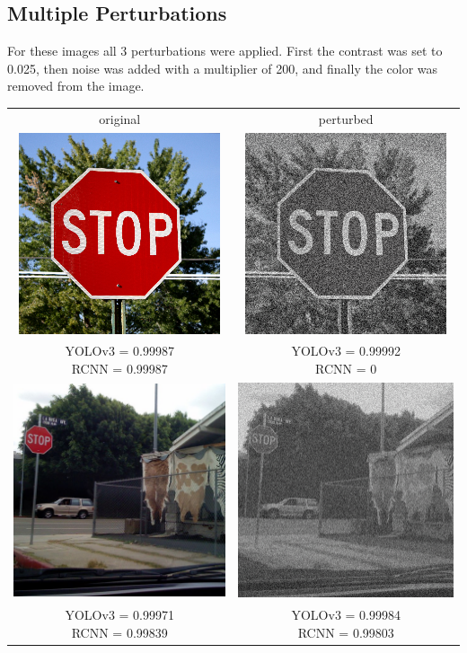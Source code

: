 \documentclass{article}
\begin{document}
\subsection{Multiple Perturbations}
For these images all 3 perturbations were applied. First the contrast was set to 0.025, then noise was added with a multiplier of 200, and finally the color was removed from the image. 
\begin{center}
\begin{tabular}{ c c }
    original & perturbed \\
    \includegraphics[width=0.3\linewidth]{../test_images/stop.png} & \includegraphics[width=0.3\linewidth]{../test_images/perturbed/stop_contrast_0_025_noise_200_grayscale_0_010.png} \\
    \makecell{YOLOv3 = 0.99987 \\ RCNN = 0.99987} & \makecell{YOLOv3 = 0.99992 \\ RCNN = 0} \\[1cm]
    \includegraphics[width=0.3\linewidth]{../test_images/stop3.png} & \includegraphics[width=0.3\linewidth]{../test_images/perturbed/stop3_contrast_0_025_noise_200_grayscale_0_010.png} \\
    \makecell{YOLOv3 = 0.99971 \\ RCNN = 0.99839} & \makecell{YOLOv3 = 0.99984 \\ RCNN = 0.99803} \\
\end{tabular}
\end{center}
\end{document}
